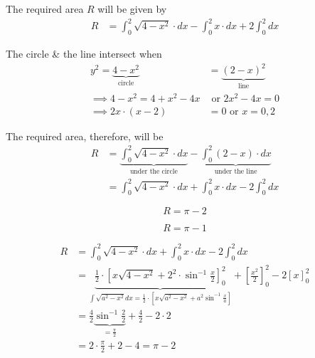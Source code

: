 \documentclass[14pt,fleqn]{extarticle}
\begin{document}
\newcard

The required area $R$ will be given by 
\begin{align}
R &= \int_0^2 \sqrt{4-x^2}\cdot dx - \int_0^2 x\cdot dx + 2\int_0^2 dx
\end{align}

\newcard

The circle \& the line intersect when 
%
\begin{align}
y^2 = \underbrace{4-x^2}_{\text{circle}} &= \underbrace{(2-x)^2}_{\text{line}}\\
\implies 4-x^2 = 4 + x^2 - 4x & \text{ or }  2x^2-4x = 0 \\
\implies 2x\cdot(x-2) &= 0 \text{ or } x = 0,2 
\end{align} 

The required area, therefore, will be 
%
\begin{align}
R &= \underbrace{\int_0^2 \sqrt{4-x^2}\cdot dx}_{\text{under the circle}} 
- \underbrace{\int_0^2 (2-x)\cdot dx}_{\text{under the line}} \\
&= \int_0^2 \sqrt{4-x^2}\cdot dx + \int_0^2 x\cdot dx - 2\int_0^2 dx
\end{align}

\newcard

\[ R = \pi - 2\] 

\newcard

\[ R = \pi - 1\] 

\newcard

%
\begin{align}
R &= \int_0^2 \sqrt{4-x^2}\cdot dx + \int_0^2 x\cdot dx - 2\int_0^2 dx\\
&= \underbrace{\frac{1}{2}\cdot\left[ x\sqrt{4-x^2}+2^2\cdot\sin^{-1}\frac{x}{2}\right]_0^2}
_{\int\sqrt{a^2-x^2}dx = \frac{1}{2}\cdot\left[x\sqrt{a^2-x^2}+a^2\sin^{-1}\frac{x}{a}\right]}+\left[\frac{x^2}{2}\right]_0^2 - 2\left[ x\right]_0^2 \\
&= \frac{4}{2}\underbrace{\sin^{-1}\frac{2}{2}}_{=\frac\pi{2}} + \frac{4}{2} - 2\cdot 2 \\
&= 2\cdot\frac\pi{2} + 2 - 4 = \pi - 2
\end{align}
\end{document}

